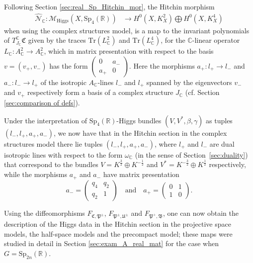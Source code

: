 \documentclass[oneside,11pt]{amsart}
\theoremstyle{definition}
\theoremstyle{remark}
\numberwithin{thm}{section}
\numberwithin{equation}{section}
\begin{document}
Following Section \ref{sec:real_Sp_Hitchin_mor}, the Hitchin morphism
\begin{align*}
 \hat{\mathcal{N}}_{\mathbb{C}}\colon  \mathcal{M}_{\mathrm{Higgs}}(X,\mathrm{Sp}_4(\mathbb{R})) & \to H^0(X, K_X^2)\bigoplus H^0(X, K_X^4) 
\end{align*}
when using the complex structures model, is a map to the invariant polynomials of $T_{J_{\mathbb{C}}}^{\mathbb{C}}\mathfrak{C}$ given by the traces $\mathrm{Tr}(L^2_{\mathbb{C}})$ and $\mathrm{Tr}(L^4_{\mathbb{C}})$, for the $\mathbb{C}$-linear operator 
$L_\mathbb C \colon A^2_{\mathbb{C}} \to A^2_{\mathbb{C}}$, which in matrix presentation with respect to the basis $v=(v_+, v_-)$  has the form $\begin{pmatrix}
    0 & a_- \\
    a_+ & 0
\end{pmatrix}$. Here the morphisms $a_{+}\colon l_{+} \to l_{-}$ and $a_{-}\colon l_{-} \to l_{+}$ of the isotropic $A_{\mathbb{C}}$-lines $l_{-}$ and $l_{+}$ spanned by the eigenvectors $v_{-}$ and $v_{+}$ respectively form a basis of a complex structure $J_{\mathbb{C}}$ 
(cf. Section \ref{sec:comparison of defs}). 
 
Under the interpretation of $\mathrm{Sp}_4(\mathbb{R})$-Higgs bundles $(V, V^*, \beta, \gamma)$ as tuples $(l_{-}, l_{+}, a_{+}, a_{-})$, we now have that in the Hitchin section in the complex structures model there lie tuples $(l_{-}, l_{+}, a_{+}, a_{-})$, where $l_{+}$ and $l_{-}$ are dual isotropic lines with respect to the form $\omega_{\mathbb{C}}$ (in the sense of Section~\ref{sec:duality}) that correspond to the bundles $V=K^{\frac{3}{2}} \oplus K^{-\frac{1}{2}}$ and $V^*=K^{-\frac{3}{2}} \oplus K^{\frac{1}{2}}$ respectively, while the morphisms $a_{+}$ and $a_{-}$ have matrix presentation
\[a_{-}=\begin{pmatrix} q_4 & q_2 \\ q_2& 1 \end{pmatrix} \quad \text{and} \quad a_{+} = \begin{pmatrix} 0 & 1 \\ 1& 0 \end{pmatrix}.\]

Using the diffeomorphisms $F_{\mathfrak{C},\mathfrak{P}^\pm}$, $F_{\mathfrak{P}^\pm,\mathfrak U^\pm}$ and $F_{\mathfrak{P}^+,\mathfrak{B}}$, one can now obtain the description of the Higgs data in the Hitchin section in the projective space models, the half-space models and the precompact model; these maps were studied in detail in Section \ref{sec:exam_A_real_mat} for the case when $G=\mathrm{Sp}_{2n}(\mathbb{R})$.
\end{document}
